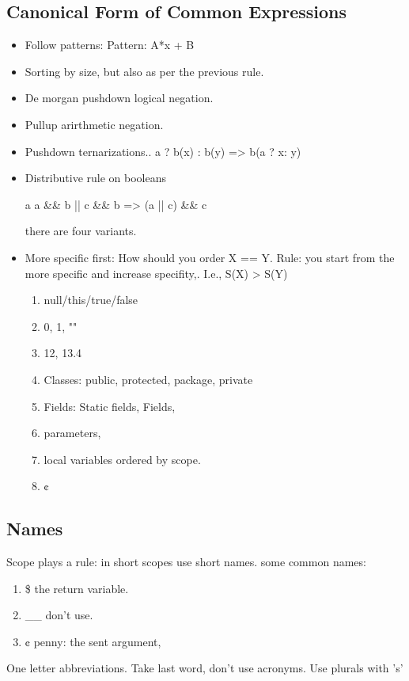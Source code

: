 \subsection{Canonical Form of Common Expressions}
\begin{itemize}
  \item Follow patterns: Pattern: A*x + B
  \item Sorting by size, but also as per the previous rule.
  \item De morgan pushdown logical negation.
  \item Pullup arirthmetic negation.
  \item Pushdown ternarizations..
        a ? b(x) : b(y) => b(a ? x: y)
  \item Distributive rule on booleans 
    \begin{listings}
a a && b || c && b => (a || c) && c 
    \end{listings}
      there are four variants.
  \item More specific first: How should you order X == Y.
        Rule: you start from the more specific and increase specifity,.
        I.e., S(X) > S(Y)

        \begin{enumerate}
          \item null/this/true/false
          \item 0, 1, ""
          \item 12, 13.4
          \item Classes: public, protected, package, private
          \item Fields: Static fields, Fields,
          \item parameters,
          \item local variables ordered by scope.
          \item ¢
        \end{enumerate}
\end{itemize}

\subsection{Names}
Scope plays a rule:
in short scopes use short names.
some common names:
\begin{enumerate}
  \item \$ the return variable.
  \item \_\_ don't use.
  \item ¢ penny: the sent argument,
\end{enumerate}
One letter abbreviations.
Take last word, don't use acronyms.
Use plurals with 's'

